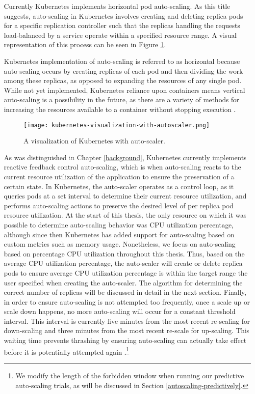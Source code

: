 Currently Kubernetes implements horizontal pod auto-scaling.
As this title suggests, auto-scaling in
Kubernetes involves creating and deleting replica pods for a specific replication
controller such that the replicas handling the requests load-balanced by a service
operate within a specified resource range. A visual representation of this
process can be seen in Figure \ref{fig:kubernetes-visualization-with-autoscaler}.

Kubernetes implementation of auto-scaling is referred to as horizontal because
auto-scaling occurs by creating replicas of each pod and then dividing the work
among these replicas, as opposed to expanding the resources of any single pod.
While not yet implemented, Kubernetes reliance upon containers means vertical
auto-scaling is a possibility in the future, as there are a variety of
methods for increasing the resources available to a container without stopping
execution \cite{docker-up-and-running}.

\begin{figure}[!h]
  \centerline{\texttt{[image: kubernetes-visualization-with-autoscaler.png]}}
  \caption{A visualization of Kubernetes with auto-scaler.}
  \label{fig:kubernetes-visualization-with-autoscaler}
\end{figure}

As was distinguished in Chapter \ref{background}, Kubernetes currently implements reactive
feedback control auto-scaling, which is when auto-scaling reacts to the current
resource utilization of the application to
ensure the preservation of a certain state.
In Kubernetes, the auto-scaler operates as a control loop,
as it queries pods at a set interval to determine
their current resource utilization, and performs auto-scaling actions to
preserve the desired level of per replica pod resource utilization.
At the start of this thesis, the only resource on which it was possible to
determine auto-scaling behavior was CPU utilization percentage, although since
then Kubernetes has added support for auto-scaling based on custom metrics such
as memory usage. Nonetheless, we focus on auto-scaling based on percentage CPU
utilization throughout this thesis.
Thus, based on the average CPU utilization percentage, the
auto-scaler will create or delete replica pods to ensure average CPU utilization
percentage is within the target range the user specified when creating the
auto-scaler. The algorithm for determining the correct number of replicas
will be discussed in detail in the next section. Finally,
in order to ensure auto-scaling is not attempted too frequently, once a
scale up or scale down happens, no more auto-scaling will occur for a constant
threshold interval. This interval is currently five minutes from the most recent
re-scaling for down-scaling and three minutes from the most recent re-scale for
up-scaling. This waiting time prevents thrashing by ensuring
auto-scaling can actually take effect before it is potentially attempted again
\cite{k8s-horizontal-pod-autoscaler-user-guide}.\footnote{We modify the length
of the forbidden window when running our predictive auto-scaling trials, as will
be discussed in Section \ref{autoscaling-predictively}.}
